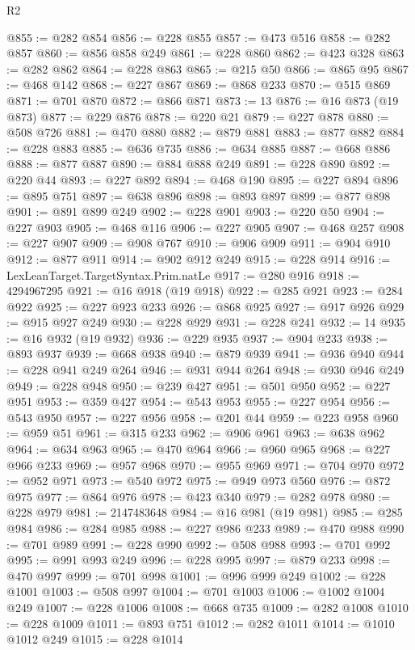\begin{lexlean}{R2}
\begin{coremodule}
@855 := @282 @854
@856 := @228 @855
@857 := @473 @516
@858 := @282 @857
@860 := @856 @858 @249
@861 := @228 @860
@862 := @423 @328
@863 := @282 @862
@864 := @228 @863
@865 := @215 @50
@866 := @865 @95
@867 := @468 @142
@868 := @227 @867
@869 := @868 @233
@870 := @515 @869
@871 := @701 @870
@872 := @866 @871
@873 := 13
@876 := @16 @873 (@19 @873)
@877 := @229 @876
@878 := @220 @21
@879 := @227 @878
@880 := @508 @726
@881 := @470 @880
@882 := @879 @881
@883 := @877 @882
@884 := @228 @883
@885 := @636 @735
@886 := @634 @885
@887 := @668 @886
@888 := @877 @887
@890 := @884 @888 @249
@891 := @228 @890
@892 := @220 @44
@893 := @227 @892
@894 := @468 @190
@895 := @227 @894
@896 := @895 @751
@897 := @638 @896
@898 := @893 @897
@899 := @877 @898
@901 := @891 @899 @249
@902 := @228 @901
@903 := @220 @50
@904 := @227 @903
@905 := @468 @116
@906 := @227 @905
@907 := @468 @257
@908 := @227 @907
@909 := @908 @767
@910 := @906 @909
@911 := @904 @910
@912 := @877 @911
@914 := @902 @912 @249
@915 := @228 @914
@916 := LexLeanTarget.TargetSyntax.Prim.natLe
@917 := @280 @916
@918 := 4294967295
@921 := @16 @918 (@19 @918)
@922 := @285 @921
@923 := @284 @922
@925 := @227 @923 @233
@926 := @868 @925
@927 := @917 @926
@929 := @915 @927 @249
@930 := @228 @929
@931 := @228 @241
@932 := 14
@935 := @16 @932 (@19 @932)
@936 := @229 @935
@937 := @904 @233
@938 := @893 @937
@939 := @668 @938
@940 := @879 @939
@941 := @936 @940
@944 := @228 @941 @249 @264
@946 := @931 @944 @264
@948 := @930 @946 @249
@949 := @228 @948
@950 := @239 @427
@951 := @501 @950
@952 := @227 @951
@953 := @359 @427
@954 := @543 @953
@955 := @227 @954
@956 := @543 @950
@957 := @227 @956
@958 := @201 @44
@959 := @223 @958
@960 := @959 @51
@961 := @315 @233
@962 := @906 @961
@963 := @638 @962
@964 := @634 @963
@965 := @470 @964
@966 := @960 @965
@968 := @227 @966 @233
@969 := @957 @968
@970 := @955 @969
@971 := @704 @970
@972 := @952 @971
@973 := @540 @972
@975 := @949 @973 @560
@976 := @872 @975
@977 := @864 @976
@978 := @423 @340
@979 := @282 @978
@980 := @228 @979
@981 := 2147483648
@984 := @16 @981 (@19 @981)
@985 := @285 @984
@986 := @284 @985
@988 := @227 @986 @233
@989 := @470 @988
@990 := @701 @989
@991 := @228 @990
@992 := @508 @988
@993 := @701 @992
@995 := @991 @993 @249
@996 := @228 @995
@997 := @879 @233
@998 := @470 @997
@999 := @701 @998
@1001 := @996 @999 @249
@1002 := @228 @1001
@1003 := @508 @997
@1004 := @701 @1003
@1006 := @1002 @1004 @249
@1007 := @228 @1006
@1008 := @668 @735
@1009 := @282 @1008
@1010 := @228 @1009
@1011 := @893 @751
@1012 := @282 @1011
@1014 := @1010 @1012 @249
@1015 := @228 @1014

\end{coremodule}
\end{lexlean}
